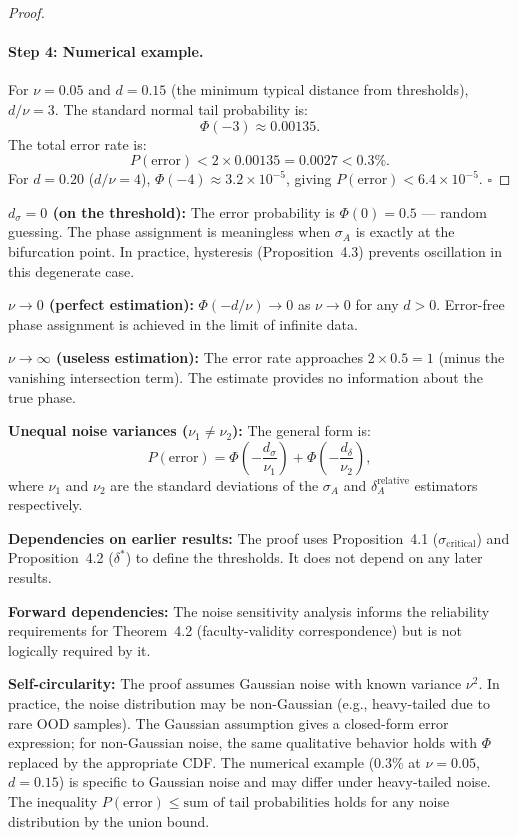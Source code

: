 \begin{proof}
\paragraph{Step 4: Numerical example.}
For $\nu = 0.05$ and $d = 0.15$ (the minimum typical distance from
thresholds), $d/\nu = 3$. The standard normal tail probability is:
\[
\Phi(-3) \approx 0.00135.
\]
The total error rate is:
\[
P(\text{error}) < 2 \times 0.00135 = 0.0027 < 0.3\%.
\]
For $d = 0.20$ ($d/\nu = 4$), $\Phi(-4) \approx 3.2 \times 10^{-5}$,
giving $P(\text{error}) < 6.4 \times 10^{-5}$.
$\square$
\end{proof}

\begin{boundary-case}
\textbf{$d_\sigma = 0$ (on the threshold):}
The error probability is $\Phi(0) = 0.5$ — random guessing. The phase
assignment is meaningless when $\sigma_A$ is exactly at the bifurcation
point. In practice, hysteresis (Proposition~4.3) prevents oscillation
in this degenerate case.

\textbf{$\nu \to 0$ (perfect estimation):}
$\Phi(-d/\nu) \to 0$ as $\nu \to 0$ for any $d > 0$. Error-free phase
assignment is achieved in the limit of infinite data.

\textbf{$\nu \to \infty$ (useless estimation):}
The error rate approaches $2 \times 0.5 = 1$ (minus the vanishing
intersection term). The estimate provides no information about the
true phase.

\textbf{Unequal noise variances ($\nu_1 \neq \nu_2$):}
The general form is:
\[
P(\text{error}) = \Phi\!\left(-\frac{d_\sigma}{\nu_1}\right)
+ \Phi\!\left(-\frac{d_\delta}{\nu_2}\right),
\]
where $\nu_1$ and $\nu_2$ are the standard deviations of the
$\sigma_A$ and $\delta_A^{\text{relative}}$ estimators respectively.
\end{boundary-case}

\begin{circularity-check}
\textbf{Dependencies on earlier results:} The proof uses
Proposition~4.1 ($\sigma_{\text{critical}}$) and
Proposition~4.2 ($\delta^*$) to define the thresholds.
It does not depend on any later results.

\textbf{Forward dependencies:} The noise sensitivity analysis
informs the reliability requirements for Theorem~4.2
(faculty-validity correspondence) but is not logically required
by it.

\textbf{Self-circularity:} The proof assumes Gaussian noise with
known variance $\nu^2$. In practice, the noise distribution may be
non-Gaussian (e.g., heavy-tailed due to rare OOD samples). The
Gaussian assumption gives a closed-form error expression; for
non-Gaussian noise, the same qualitative behavior holds with
$\Phi$ replaced by the appropriate CDF. The numerical example
($0.3\%$ at $\nu = 0.05$, $d = 0.15$) is specific to Gaussian
noise and may differ under heavy-tailed noise. The inequality
$P(\text{error}) \leq \text{sum of tail probabilities}$ holds
for any noise distribution by the union bound.
\end{circularity-check}
